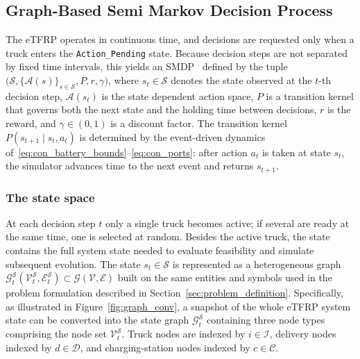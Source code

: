 \documentclass[journal]{IEEEtran}
\begin{document}
\subsection{Graph-Based Semi Markov Decision Process}\label{sec:smdp}
The eTFRP operates in continuous time, and decisions are requested only when a truck enters the \texttt{Action\_Pending} state. Because decision steps are not separated by fixed time intervals, this yields an SMDP~\cite{Elsevier2013_ISBN9780124077959} defined by the tuple
$\big(\mathcal{S},\{\mathcal{A}(s)\}_{s\in\mathcal{S}},P,r,\gamma\big)$,
where $s_t\in\mathcal{S}$ denotes the state observed at the $t$-th decision step, $\mathcal{A}(s_t)$ is the state dependent action space, $P$ is a transition kernel that governs both the next state and the holding time between decisions, $r$ is the reward, and $\gamma\in(0,1)$ is a discount factor. 
The transition kernel $P(s_{t+1} \mid s_t, a_t)$ is determined by the event-driven dynamics of~\eqref{eq:con_battery_bounds}--\eqref{eq:con_ports}: after action $a_t$ is taken at state $s_t$, the simulator advances time to the next event and returns $s_{t+1}$. 

\subsubsection{The state space}

At each decision step $t$ only a single truck becomes active; if several are ready at the same time, one is selected at random. Besides the active truck, the state contains the full system state needed to evaluate feasibility and simulate subsequent evolution. The state $s_t\in \mathcal{S}$ is represented as a heterogeneous graph $\mathcal{G}^{\mathcal{S}}_t(\mathcal{V}^{\mathcal{S}}_t,\mathcal{E}^{\mathcal{S}}_t) \subset \mathcal{G}(\mathcal{V},\mathcal{E})$ built on the same entities and symbols used in the problem formulation described in Section~\ref{sec:problem_definition}.
Specifically, as illustrated in Figure~\ref{fig:graph_conv}, a snapshot of the whole eTFRP system state can be converted into the state graph $\mathcal{G}^{\mathcal{S}}_t$ containing three node types comprising the node set $\mathcal{V}^{\mathcal{S}}_t$. Truck nodes are indexed by $i\in\mathcal{I}$, delivery nodes indexed by $d\in\mathcal{D}$, and charging-station nodes indexed by $c\in\mathcal{C}$.
\end{document}
